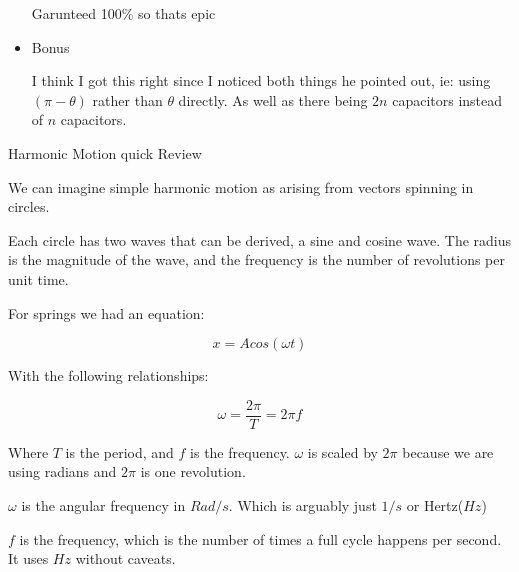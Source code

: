 \documentclass{report}
\begin{document}
\begin{description}
\begin{mdframed}
\begin{itemize}
\begin{mdframed}
                        Garunteed 100\% so thats epic
                    \end{mdframed}
                \item Bonus
                    \begin{mdframed}
                        I think I got this right since I noticed
                        both things he pointed out, ie: using
                        $(\pi - \theta)$ rather than  $\theta$
                        directly. As well as there being  $2n$
                        capacitors instead of $n$ capacitors.
                    \end{mdframed}
            \end{itemize}
        \end{mdframed}
        \pagebreak
    \item {\large Harmonic Motion quick Review}
        \begin{mdframed}
            We can imagine simple harmonic motion as arising
            from vectors spinning in circles.

            Each circle has two waves that can be derived,
            a sine and cosine wave. The radius is the magnitude
            of the wave, and the frequency is the number of
            revolutions per unit time.

            For springs we had an equation:

            \begin{displaymath}
                x = A cos(\omega t)
            \end{displaymath}

            With the following relationships:

            \begin{displaymath}
                \omega = \frac{2\pi}{T} = 2\pi f
            \end{displaymath}

            Where $T$ is the period, and $f$ is the
            frequency. $\omega$ is scaled by $2\pi$ 
            because we are using radians and $2\pi$ is
            one revolution.

            \begin{mdframed}
                $\omega$ is the angular frequency in
                $\si{Rad/s}$. Which is arguably
                just $\si{1/s}$ or Hertz($\si{Hz}$)
            \end{mdframed}

            \begin{mdframed}
                $f$ is the frequency, which is the
                number of times a full cycle happens
                per second. It uses  $\si{Hz}$ without
                caveats.
            \end{mdframed}
            

\end{mdframed}
\end{description}
\end{document}

